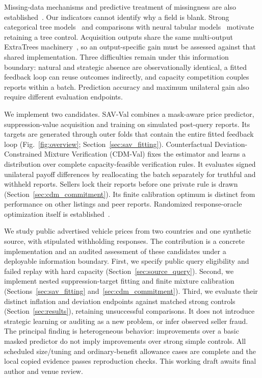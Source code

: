 \documentclass[pdflatex,sn-nature]{sn-jnl}
\begin{document}
Missing-data mechanisms and predictive treatment of missingness are also
established~\cite{rubin1976missing,lemorvan2021imputation,lemorvan2020neumiss}.
Our indicators cannot identify why a field is blank. Strong categorical
tree models~\cite{prokhorenkova2018catboost} and comparisons with neural tabular
models~\cite{gorishniy2021tabular} motivate retaining a tree control. Acquisition
outputs share the same multi-output ExtraTrees machinery~\cite{geurts2006extratrees},
so an output-specific gain must be assessed against that shared implementation.
Three difficulties remain under this information boundary: natural and
strategic absence are observationally identical, a fitted feedback loop can
reuse outcomes indirectly, and capacity competition couples reports within
a batch. Prediction accuracy and maximum unilateral gain also require
different evaluation endpoints.

We implement two candidates. SAV-Val combines a mask-aware price predictor,
suppression-value acquisition and training on simulated post-query reports.
Its targets are generated through outer folds that contain the entire fitted
feedback loop (Fig.~\ref{fig:overview}; Section~\ref{sec:sav_fitting}).
Counterfactual Deviation-Constrained Mixture Verification (CDM-Val) fixes
the estimator and learns
a distribution over complete capacity-feasible verification rules. It evaluates
signed unilateral payoff differences by reallocating the batch separately for
truthful and withheld reports. Sellers lock their reports before one private
rule is drawn (Section~\ref{sec:cdm_commitment}). Its finite calibration optimum
is distinct from performance on
other listings and peer reports. Randomized response-oracle optimization itself
is established~\cite{jain2011doubleoracle}.

We study public advertised vehicle prices from two countries and one synthetic
source, with stipulated withholding responses. The contribution is a concrete
implementation and an audited assessment of these candidates under a deployable
information boundary. First, we specify public query eligibility and failed
replay with hard capacity (Section~\ref{sec:source_query}). Second, we implement
nested suppression-target fitting and finite mixture calibration
(Sections~\ref{sec:sav_fitting} and~\ref{sec:cdm_commitment}). Third, we evaluate
their distinct inflation and deviation endpoints against matched strong
controls (Section~\ref{sec:results}), retaining unsuccessful comparisons.
It does not introduce strategic learning or auditing as a new
problem, or infer observed seller fraud. The principal finding is heterogeneous
behavior: improvements over a basic masked predictor do not imply improvements
over strong simple controls. All scheduled size/tuning and ordinary-benefit
allowance cases are complete and the local copied evidence passes
reproduction checks. This working draft awaits final author and venue review.
\end{document}
